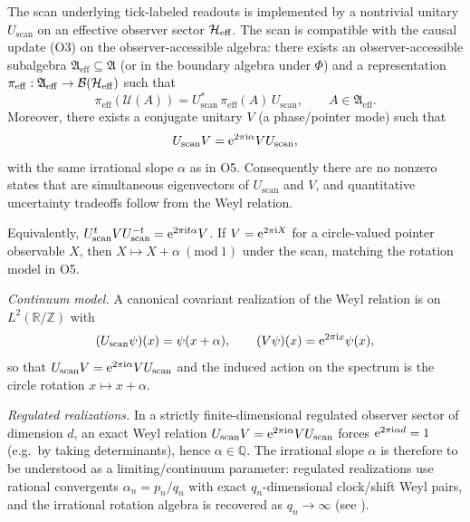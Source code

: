 \begin{axiom}
The scan underlying tick-labeled readouts is implemented by a nontrivial unitary $U_{\mathrm{scan}}$ on an effective observer sector $\mathcal{H}_{\mathrm{eff}}$. The scan is compatible with the causal update (O3) on the observer-accessible algebra: there exists an observer-accessible subalgebra $\mathfrak{A}_{\mathrm{eff}}\subseteq \mathfrak{A}$ (or in the boundary algebra under $\Phi$) and a representation $\pi_{\mathrm{eff}}:\mathfrak{A}_{\mathrm{eff}}\to\mathcal{B}(\mathcal{H}_{\mathrm{eff}})$ such that
\begin{equation}
    \pi_{\mathrm{eff}}(\mathcal{U}(A))=U_{\mathrm{scan}}^{*}\,\pi_{\mathrm{eff}}(A)\,U_{\mathrm{scan}},\qquad A\in\mathfrak{A}_{\mathrm{eff}}.
\end{equation}
Moreover, there exists a conjugate unitary $V$ (a phase/pointer mode) such that
\begin{equation}
    U_{\mathrm{scan}}V = \mathrm{e}^{2\pi \mathrm{i} \alpha} VU_{\mathrm{scan}},
\end{equation}
with the same irrational slope $\alpha$ as in O5. Consequently there are no nonzero states that are simultaneous eigenvectors of $U_{\mathrm{scan}}$ and $V$, and quantitative uncertainty tradeoffs follow from the Weyl relation.
\par
Equivalently, $U_{\mathrm{scan}}^{t} V U_{\mathrm{scan}}^{-t}=\mathrm{e}^{2\pi \mathrm{i} t\alpha}V$. If $V=\mathrm{e}^{2\pi \mathrm{i} X}$ for a circle-valued pointer observable $X$, then $X\mapsto X+\alpha\ (\mathrm{mod}\ 1)$ under the scan, matching the rotation model in O5.
\par
\emph{Continuum model.} A canonical covariant realization of the Weyl relation is on $L^{2}(\mathbb{R}/\mathbb{Z})$ with
\begin{equation}
    (U_{\mathrm{scan}}\psi)(x)=\psi(x+\alpha),\qquad (V\psi)(x)=\mathrm{e}^{2\pi \mathrm{i} x}\psi(x),
\end{equation}
so that $U_{\mathrm{scan}}V=\mathrm{e}^{2\pi \mathrm{i} \alpha}VU_{\mathrm{scan}}$ and the induced action on the spectrum is the circle rotation $x\mapsto x+\alpha$.
\par
\emph{Regulated realizations.} In a strictly finite-dimensional regulated observer sector of dimension $d$, an exact Weyl relation $U_{\mathrm{scan}}V=\mathrm{e}^{2\pi \mathrm{i} \alpha}VU_{\mathrm{scan}}$ forces $\mathrm{e}^{2\pi \mathrm{i} \alpha d}=1$ (e.g.\ by taking determinants), hence $\alpha\in\mathbb{Q}$. The irrational slope $\alpha$ is therefore to be understood as a limiting/continuum parameter: regulated realizations use rational convergents $\alpha_n=p_n/q_n$ with exact $q_n$-dimensional clock/shift Weyl pairs, and the irrational rotation algebra is recovered as $q_n\to\infty$ (see \cite{Ma2025HPA}).
\end{axiom}
